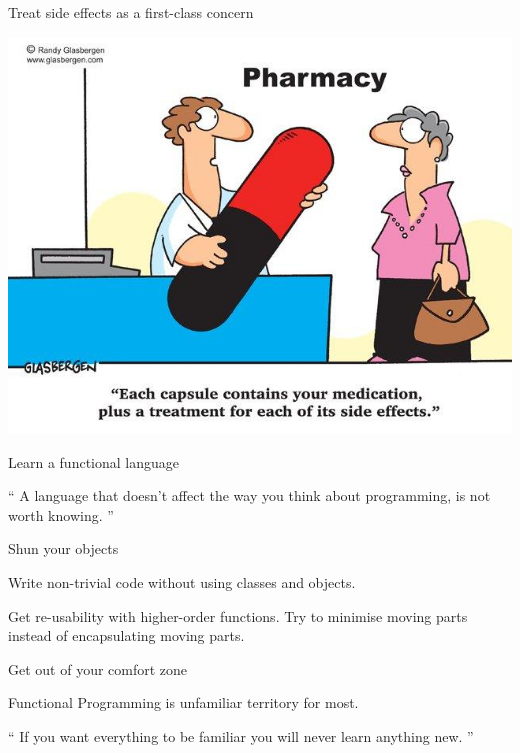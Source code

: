 \documentclass[mathserif]{beamer}
\begin{document}
\begin{frame}{Treat side effects as a first-class concern}

  \begin{center}
    \includegraphics[scale=0.4]{img/side-effects-cartoon.jpg}
  \end{center}

\end{frame}

\begin{frame}{Learn a functional language}

\begin{exampleblock}{}
  {\Large ``
    A language that doesn't affect the way you think about programming, is not worth knowing.
  ''}
  \vskip5mm
  \hspace*{}
\end{exampleblock}

\end{frame}

\begin{frame}{Shun your objects}

  {\Huge Write non-trivial code without using classes and objects.}
  \vskip5mm
  
  {\Large Get \alert{re-usability} with higher-order functions.}
  \vskip2mm
  {\Large Try to \alert{minimise moving parts} instead of encapsulating moving parts.\cite{mfeathers}}

\end{frame}

\begin{frame}{Get out of your comfort zone}

  {\Large Functional Programming is unfamiliar territory for most.}

\begin{exampleblock}{}
  {\Large ``
    If you want everything to be familiar you will never learn anything new.
  ''}
  \vskip5mm
  \hspace*{}
\end{exampleblock}

\end{frame}
\end{document}

